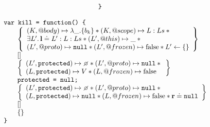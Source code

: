 \documentclass[a4paper]{article}
\begin{document}
\[\begin{array}{l}
\begin{array}{@{\qquad}l}
{      }
    \end{array} \\
    \js{\}}
  \end{array}
\]

\[
  \begin{array}{l}
    \js{var kill = function() \{} \\
    \begin{array}{@{\qquad}l}
      \logic{
        (K, @body) \mapsto \lambda \_.\{b_k\} \sep (K, @scope) \mapsto L:Ls \sep {} \\
        \exists L' \st \ls \doteq L' : L : Ls \sep (L',@this) \mapsto \_ \sep {} \\
        (L',@proto) \mapsto \nil \sep (L',@frozen) \mapsto \false \sep L' \bp \{\}
      } \\
      \step{} \\
      \logic{
        (L',\js{protected}) \mapsto \none \sep (L',@proto) \mapsto \nil \sep {} \\
        (L, \js{protected}) \mapsto V \sep
        (L,@frozen) \mapsto \false
      } \\
      \js{protected = null;} \\
      \logic{
        (L',\js{protected}) \mapsto \none \sep (L',@proto) \mapsto \nil \sep {} \\
        (L, \js{protected}) \mapsto \nil \sep
        (L,@frozen) \mapsto \false \sep \rv \doteq \nil
      } \\
      \step{} \\
      \logic{

      } \\
    \end{array} \\
    \js{\}}
  \end{array}
\]
\end{document}
